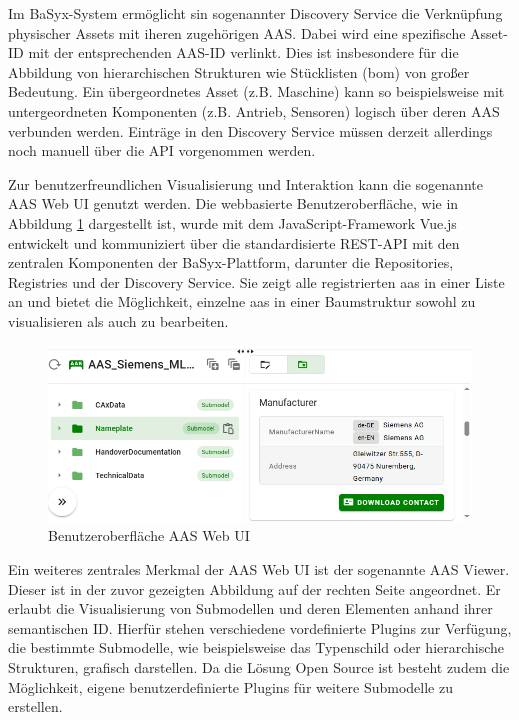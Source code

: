 

Im BaSyx-System ermöglicht sin sogenannter Discovery Service die Verknüpfung physischer Assets mit iheren zugehörigen AAS.
Dabei wird eine spezifische Asset-ID mit der entsprechenden AAS-ID verlinkt.
Dies ist insbesondere für die Abbildung von hierarchischen Strukturen wie Stücklisten (\ac{bom}) von großer Bedeutung.
Ein übergeordnetes Asset (z.B. Maschine) kann so beispielsweise mit untergeordneten Komponenten (z.B. Antrieb, Sensoren) logisch über deren AAS verbunden werden.
Einträge in den Discovery Service müssen derzeit allerdings noch manuell über die API vorgenommen werden.

Zur benutzerfreundlichen Visualisierung und Interaktion kann die sogenannte AAS Web UI genutzt werden.
Die webbasierte Benutzeroberfläche, wie in Abbildung \ref{fig:BasyxWebUI} dargestellt ist, wurde mit dem JavaScript-Framework Vue.js entwickelt und kommuniziert über die standardisierte REST-API mit den zentralen Komponenten der BaSyx-Plattform, darunter die Repositories, Registries und der Discovery Service.
Sie zeigt alle registrierten \acs{aas} in einer Liste an und bietet die Möglichkeit, einzelne \acs{aas} in einer Baumstruktur sowohl zu visualisieren als auch zu bearbeiten. 

\begin{figure}[htbp]
    \centering
    \includegraphics[width=1\textwidth]{Bilder/BaSyx/Grundlagen.png}
    \caption{Benutzeroberfläche AAS Web UI}
    \label{fig:BasyxWebUI}
\end{figure}

Ein weiteres zentrales Merkmal der AAS Web UI ist der sogenannte AAS Viewer.
Dieser ist in der zuvor gezeigten Abbildung auf der rechten Seite angeordnet.
Er erlaubt die Visualisierung von Submodellen und deren Elementen anhand ihrer semantischen ID. 
Hierfür stehen verschiedene vordefinierte Plugins zur Verfügung, die bestimmte Submodelle, wie beispielsweise das Typenschild oder hierarchische Strukturen, grafisch darstellen.
Da die Lösung Open Source ist besteht zudem die Möglichkeit, eigene benutzerdefinierte Plugins für weitere Submodelle zu erstellen. \cite{BaSyxWiki} \cite{BaSyxEclipse}

